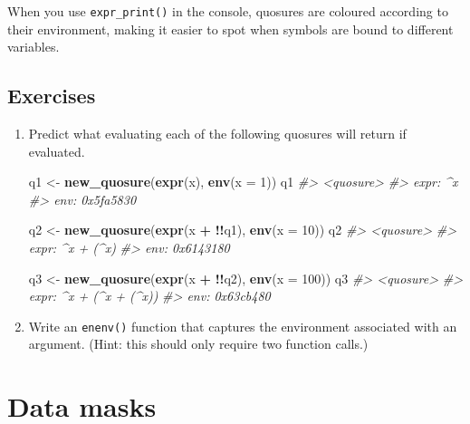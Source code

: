 \documentclass[]{book}
\newenvironment{Shaded}{\begin{snugshade}}{\end{snugshade}}
\newcommand{\CommentTok}[1]{\textcolor[rgb]{0.37,0.37,0.37}{\textit{#1}}}
\newcommand{\DataTypeTok}[1]{\textcolor[rgb]{0.27,0.27,0.27}{#1}}
\newcommand{\DecValTok}[1]{\textcolor[rgb]{0.06,0.06,0.06}{#1}}
\newcommand{\KeywordTok}[1]{\textcolor[rgb]{0.27,0.27,0.27}{\textbf{#1}}}
\newcommand{\NormalTok}[1]{#1}
\newcommand{\OperatorTok}[1]{\textcolor[rgb]{0.43,0.43,0.43}{\textbf{#1}}}
\newcommand{\StringTok}[1]{\textcolor[rgb]{0.5,0.5,0.5}{#1}}
\begin{document}
When you use \texttt{expr\_print()} in the console, quosures are coloured according to their environment, making it easier to spot when symbols are bound to different variables.

\hypertarget{exercises-10}{%
\subsection{Exercises}\label{exercises-10}}

\begin{enumerate}
\def\labelenumi{\arabic{enumi}.}
\item
  Predict what evaluating each of the following quosures will return if
  evaluated.

\begin{Shaded}
\begin{Highlighting}[]
\NormalTok{q1 <-}\StringTok{ }\KeywordTok{new_quosure}\NormalTok{(}\KeywordTok{expr}\NormalTok{(x), }\KeywordTok{env}\NormalTok{(}\DataTypeTok{x =} \DecValTok{1}\NormalTok{))}
\NormalTok{q1}
\CommentTok{#> <quosure>}
\CommentTok{#> expr: ^x}
\CommentTok{#> env:  0x5fa5830}

\NormalTok{q2 <-}\StringTok{ }\KeywordTok{new_quosure}\NormalTok{(}\KeywordTok{expr}\NormalTok{(x }\OperatorTok{+}\StringTok{ }\OperatorTok{!!}\NormalTok{q1), }\KeywordTok{env}\NormalTok{(}\DataTypeTok{x =} \DecValTok{10}\NormalTok{))}
\NormalTok{q2}
\CommentTok{#> <quosure>}
\CommentTok{#> expr: ^x + (^x)}
\CommentTok{#> env:  0x6143180}

\NormalTok{q3 <-}\StringTok{ }\KeywordTok{new_quosure}\NormalTok{(}\KeywordTok{expr}\NormalTok{(x }\OperatorTok{+}\StringTok{ }\OperatorTok{!!}\NormalTok{q2), }\KeywordTok{env}\NormalTok{(}\DataTypeTok{x =} \DecValTok{100}\NormalTok{))}
\NormalTok{q3}
\CommentTok{#> <quosure>}
\CommentTok{#> expr: ^x + (^x + (^x))}
\CommentTok{#> env:  0x63cb480}
\end{Highlighting}
\end{Shaded}
\item
  Write an \texttt{enenv()} function that captures the environment associated
  with an argument. (Hint: this should only require two function calls.)
\end{enumerate}

\hypertarget{data-masks}{%
\section{Data masks}\label{data-masks}}

\end{document}
